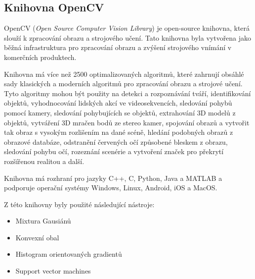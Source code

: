 \subsection{Knihovna OpenCV}
OpenCV (\textit{Open Source Computer Vision Library}) je open-source knihovna, která slouží k zpracování obrazu a strojového učení. Tato knihovna byla vytvořena jako běžná infrastruktura pro zpracování obrazu a zvýšení strojového vnímání v komerčních produktech.

Knihovna má více než 2500 optimalizovaných algoritmů, které zahrnují obsáhlé sady klasických a moderních algoritmů pro zpracování obrazu a strojové učení. Tyto algoritmy mohou být použity na detekci a rozpoznávání tváří, identifikování objektů, vyhodnocování lidských akcí ve videosekvencích, sledování pohybů pomocí kamery, sledování pohybujících se objektů, extrahování 3D modelů z objektů, vytváření 3D mračen bodů ze stereo kamer, spojování obrazů a vytvořit tak obraz s vysokým rozlišením na dané scéně, hledání podobných obrazů z obrazové databáze, odstranění červených očí způsobené bleskem z obrazu, sledování pohybu očí, rozeznání scenérie a vytvoření značek pro překrytí rozšířenou realitou a další.

Knihovna má rozhraní pro jazyky C++, C, Python, Java a MATLAB a podporuje operační systémy Windows, Linux, Android, iOS a MacOS. 




Z této knihovny byly použité následující nástroje:

\begin{itemize}
  \item{Mixtura Gausiánů}
  \item{Konvexní obal}
  \item{Histogram orientovaných gradientů}
  \item{Support vector machines}
\end{itemize}